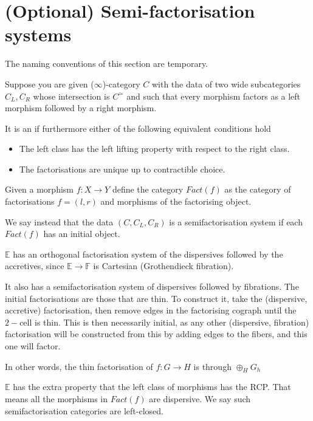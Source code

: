 \section{(Optional) Semi-factorisation systems}
    The naming conventions of this section are temporary.

    Suppose you are given ($\infty$)-category $C$ with the data of two wide subcategories $C_L,C_R$ whose intersection is $C^\simeq$ and such that every morphism factors as a left morphism followed by a right morphism.

    It is an  if furthermore either of the following equivalent conditions hold
    \begin{itemize}
        \item The left class has the left lifting property with respect to the right class.
        \item The factorisations are unique up to contractible choice.
    \end{itemize}

Given a morphism $f:X\rightarrow Y$ define the category $Fact(f)$ as the category of factorisations $f=(l,r)$ and morphisms of the factorising object.

We say instead that the data $(C,C_L,C_R)$ is a semifactorisation system if each $Fact(f)$ has an initial object.

\begin{example}
    $\mathbb{E}$ has an orthogonal factorisation system of the dispersives followed by the accretives, since $\mathbb{E}\rightarrow \mathbb{F}$ is Cartesian (Grothendieck fibration).

    It also has a semifactorisation system of dispersives followed by fibrations. The initial factorisations are those that are thin. To construct it, take the (dispersive, accretive) factorisation, then remove edges in the factorising cograph until the $2-$cell is thin. This is then necessarily initial, as any other (dispersive, fibration) factorisation will be constructed from this by adding edges to the fibers, and this one will factor.

    In other words, the thin factorisation of $f:G\rightarrow H$ is through $\oplus_{H}G_h$
\end{example}

$\mathbb{E}$ has the extra property that the left class of morphisms has the RCP. That means all the morphisms in $Fact(f)$ are dispersive. We say such semifactorisation categories are left-closed.

